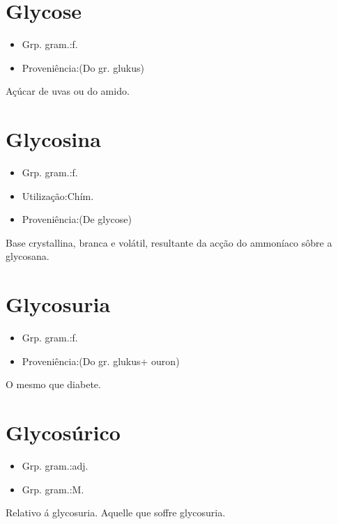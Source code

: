 \section{Glycose}
\begin{itemize}
\item {Grp. gram.:f.}
\end{itemize}
\begin{itemize}
\item {Proveniência:(Do gr. \textunderscore glukus\textunderscore )}
\end{itemize}
Açúcar de uvas ou do amido.
\section{Glycosina}
\begin{itemize}
\item {Grp. gram.:f.}
\end{itemize}
\begin{itemize}
\item {Utilização:Chím.}
\end{itemize}
\begin{itemize}
\item {Proveniência:(De \textunderscore glycose\textunderscore )}
\end{itemize}
Base crystallina, branca e volátil, resultante da acção do ammoníaco sôbre a glycosana.
\section{Glycosuria}
\begin{itemize}
\item {Grp. gram.:f.}
\end{itemize}
\begin{itemize}
\item {Proveniência:(Do gr. \textunderscore glukus\textunderscore  + \textunderscore ouron\textunderscore )}
\end{itemize}
O mesmo que \textunderscore diabete\textunderscore .
\section{Glycosúrico}
\begin{itemize}
\item {Grp. gram.:adj.}
\end{itemize}
\begin{itemize}
\item {Grp. gram.:M.}
\end{itemize}
Relativo á glycosuria.
Aquelle que soffre glycosuria.
